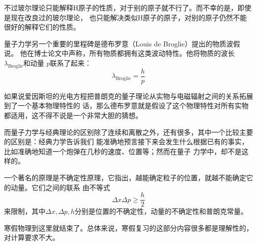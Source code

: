 不过玻尔理论只能解释H原子的性质，对于别的原子就不行了。而不幸的是，即使是现在改良过的玻尔理论，
也只能解决类似H原子的原子，对别的原子仍然不能很好的解释它们的性质。

量子力学另一个重要的里程碑是德布罗意（Louis de Broglie）提出的物质波假说。
他在博士论文中声称，所有物质都拥有这类波动特性。他将物质的波长$\lambda_\text{Broglie}$和动量
$p$联系了起来：
\begin{equation}
\lambda_\text{Broglie} = \frac{h}{p}
\end{equation}

如果说爱因斯坦的光电方程把普朗克的量子理论从实物与电磁辐射之间的关系拓展到了一个基本物理特性的
话，那么德布罗意就是假设了这个物理特性对所有实物都适用，这不得不说是一个非常大胆的猜想。

而量子力学与经典理论的区别除了连续和离散之外，还有很多，其中一个比较主要的区别是：经典力学告诉我们
能准确地预言接下来会发生什么根据已有的事实，比如准确地知道一个炮弹在几秒的速度、位置等；然而在量子
力学中，却不是这样的。

一个著名的原理是不确定性原理，它指出，越能确定粒子的位置，就越不能确定它的动量。它们之间的联系
由不等式
\begin{equation}
\Delta x\Delta p \geq \frac{h}{2}
\end{equation}
来限制，其中$\Delta x,\Delta p,h$分别是位置的不确定性，动量的不确定性和普朗克常量。

寒假物理到这里就结束了。总体来说，寒假复习的这部分内容很多都是理解性的，对计算要求不大。